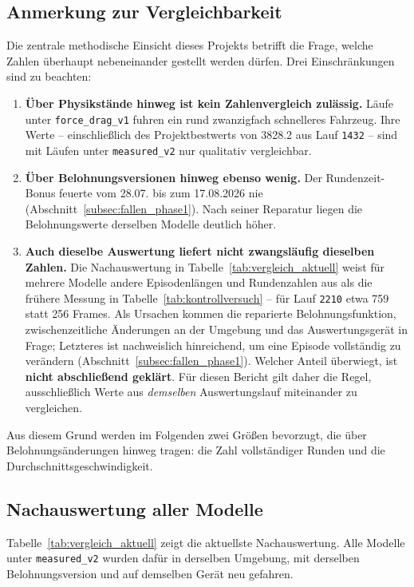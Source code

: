 \subsection*{Anmerkung zur Vergleichbarkeit}

Die zentrale methodische Einsicht dieses Projekts betrifft die Frage, welche Zahlen überhaupt nebeneinander gestellt werden dürfen. Drei Einschränkungen sind zu beachten:

\begin{enumerate}
  \item \textbf{Über Physikstände hinweg ist kein Zahlenvergleich zulässig.} Läufe unter \texttt{force\_drag\_v1} fuhren ein rund zwanzigfach schnelleres Fahrzeug. Ihre Werte -- einschließlich des Projektbestwerts von \num{3828.2} aus Lauf \texttt{1432} -- sind mit Läufen unter \texttt{measured\_v2} nur qualitativ vergleichbar.
  \item \textbf{Über Belohnungsversionen hinweg ebenso wenig.} Der Rundenzeit-Bonus feuerte vom 28.07. bis zum 17.08.2026 nie (Abschnitt~\ref{subsec:fallen_phase1}). Nach seiner Reparatur liegen die Belohnungswerte derselben Modelle deutlich höher.
  \item \textbf{Auch dieselbe Auswertung liefert nicht zwangsläufig dieselben Zahlen.} Die Nachauswertung in Tabelle~\ref{tab:vergleich_aktuell} weist für mehrere Modelle andere Episodenlängen und Rundenzahlen aus als die frühere Messung in Tabelle~\ref{tab:kontrollversuch} -- für Lauf \texttt{2210} etwa \num{759} statt \num{256} Frames. Als Ursachen kommen die reparierte Belohnungsfunktion, zwischenzeitliche Änderungen an der Umgebung und das Auswertungsgerät in Frage; Letzteres ist nachweislich hinreichend, um eine Episode vollständig zu verändern (Abschnitt~\ref{subsec:fallen_phase1}). Welcher Anteil überwiegt, ist \textbf{nicht abschließend geklärt}. Für diesen Bericht gilt daher die Regel, ausschließlich Werte aus \emph{demselben} Auswertungslauf miteinander zu vergleichen.
\end{enumerate}

Aus diesem Grund werden im Folgenden zwei Größen bevorzugt, die über Belohnungsänderungen hinweg tragen: die Zahl vollständiger Runden und die Durchschnittsgeschwindigkeit.

\subsection*{Nachauswertung aller Modelle}

Tabelle~\ref{tab:vergleich_aktuell} zeigt die aktuellste Nachauswertung. Alle Modelle unter \texttt{measured\_v2} wurden dafür in derselben Umgebung, mit derselben Belohnungsversion und auf demselben Gerät neu gefahren.

